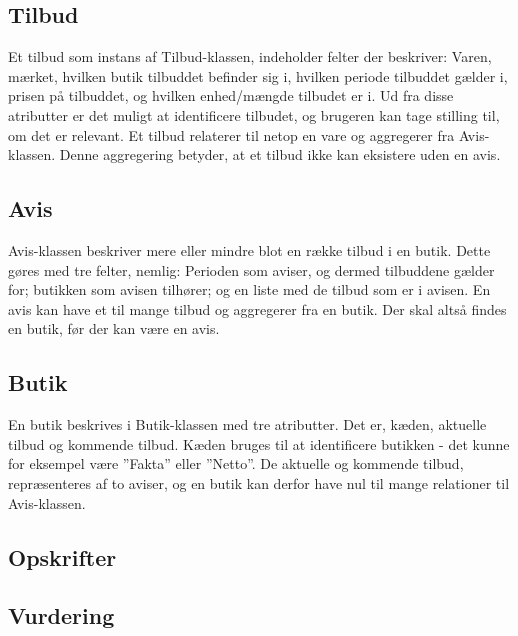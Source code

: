 \subsection{Tilbud}
Et tilbud som instans af Tilbud-klassen, indeholder felter der beskriver: Varen, mærket, hvilken butik tilbuddet befinder sig i, hvilken periode tilbuddet gælder i, prisen på tilbuddet, og hvilken enhed/mængde tilbudet er i. 
Ud fra disse atributter er det muligt at identificere tilbudet, og brugeren kan tage stilling til, om det er relevant. 
Et tilbud relaterer til netop en vare og aggregerer fra Avis-klassen. 
Denne aggregering betyder, at et tilbud ikke kan eksistere uden en avis.

\subsection{Avis}
Avis-klassen beskriver mere eller mindre blot en række tilbud i en butik. 
Dette gøres med tre felter, nemlig: Perioden som aviser, og dermed tilbuddene gælder for; butikken som avisen tilhører; og en liste med de tilbud som er i avisen. 
En avis kan have et til mange tilbud og aggregerer fra en butik.
Der skal altså findes en butik, før der kan være en avis.

\subsection{Butik}
En butik beskrives i Butik-klassen med tre atributter.
Det er, kæden, aktuelle tilbud og kommende tilbud. Kæden bruges til at identificere butikken - det kunne for eksempel være ''Fakta'' eller ''Netto''.
De aktuelle og kommende tilbud, repræsenteres af to aviser, og en butik kan derfor have nul til mange relationer til Avis-klassen.

\subsection{Opskrifter}
\lipsum[1]

\subsection{Vurdering}
\lipsum[1]